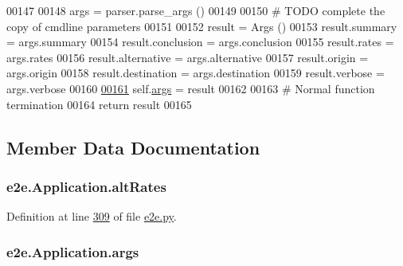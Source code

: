 \begin{DoxyCode}
00147                              
00148         args = parser.parse\_args ()
00149         
00150         \textcolor{comment}{# TODO complete the copy of cmdline parameters}
00151         
00152         result = Args ()
00153         result.summary     = args.summary 
00154         result.conclusion  = args.conclusion 
00155         result.rates       = args.rates 
00156         result.alternative = args.alternative 
00157         result.origin      = args.origin 
00158         result.destination = args.destination 
00159         result.verbose     = args.verbose
00160         
\hypertarget{classe2e_1_1_application.tex_l00161}{}\hyperlink{classe2e_1_1_application_abade6fc2e2c04ddd7e48137a2a7721bd}{00161}         self.\hyperlink{classe2e_1_1_application_abade6fc2e2c04ddd7e48137a2a7721bd}{args} = result
00162         
00163         \textcolor{comment}{# Normal function termination}
00164         \textcolor{keywordflow}{return} result
00165         
\end{DoxyCode}


\subsection{Member Data Documentation}
\subsubsection[{\texorpdfstring{alt\+Rates}{altRates}}]{\setlength{\rightskip}{0pt plus 5cm}e2e.\+Application.\+alt\+Rates}\hypertarget{classe2e_1_1_application_a92626ca2a674ccbba7f743b13c77fd7b}{}\label{classe2e_1_1_application_a92626ca2a674ccbba7f743b13c77fd7b}


Definition at line \hyperlink{e2e_8py_source_l00309}{309} of file \hyperlink{e2e_8py_source}{e2e.\+py}.

\subsubsection[{\texorpdfstring{args}{args}}]{\setlength{\rightskip}{0pt plus 5cm}e2e.\+Application.\+args}\hypertarget{classe2e_1_1_application_abade6fc2e2c04ddd7e48137a2a7721bd}{}\label{classe2e_1_1_application_abade6fc2e2c04ddd7e48137a2a7721bd}


